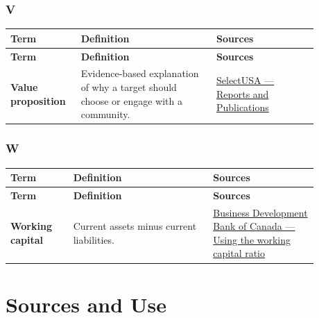 \documentclass[11pt,letterpaper,oneside,openany]{book}
\begin{document}
\section[V]{V}
\begin{center}
\small
\setlength{\LTpre}{0.4em}
\setlength{\LTpost}{0.8em}
\begin{longtable}{>{\RaggedRight\arraybackslash}p{0.180\linewidth}>{\RaggedRight\arraybackslash}p{0.400\linewidth}>{\RaggedRight\arraybackslash}p{0.300\linewidth}}
\rowcolor{DeepNavy}
\color{white}\bfseries Term & \color{white}\bfseries Definition & \color{white}\bfseries Sources \\
\endfirsthead
\rowcolor{DeepNavy}
\color{white}\bfseries Term & \color{white}\bfseries Definition & \color{white}\bfseries Sources \\
\endhead
\textbf{Value proposition} & Evidence-based explanation of why a target should choose or engage with a community. & \href{https://www.trade.gov/selectusa-reports-and-publications}{SelectUSA --- Reports and Publications} \\
\end{longtable}
\end{center}
\section[W]{W}
\begin{center}
\small
\setlength{\LTpre}{0.4em}
\setlength{\LTpost}{0.8em}
\begin{longtable}{>{\RaggedRight\arraybackslash}p{0.180\linewidth}>{\RaggedRight\arraybackslash}p{0.400\linewidth}>{\RaggedRight\arraybackslash}p{0.300\linewidth}}
\rowcolor{DeepNavy}
\color{white}\bfseries Term & \color{white}\bfseries Definition & \color{white}\bfseries Sources \\
\endfirsthead
\rowcolor{DeepNavy}
\color{white}\bfseries Term & \color{white}\bfseries Definition & \color{white}\bfseries Sources \\
\endhead
\textbf{Working capital} & Current assets minus current liabilities. & \href{https://www.bdc.ca/en/articles-tools/money-finance/manage-finances/using-working-capital-ratio}{Business Development Bank of Canada --- Using the working capital ratio} \\
\end{longtable}
\end{center}

\part{Sources and Use}
\end{document}
